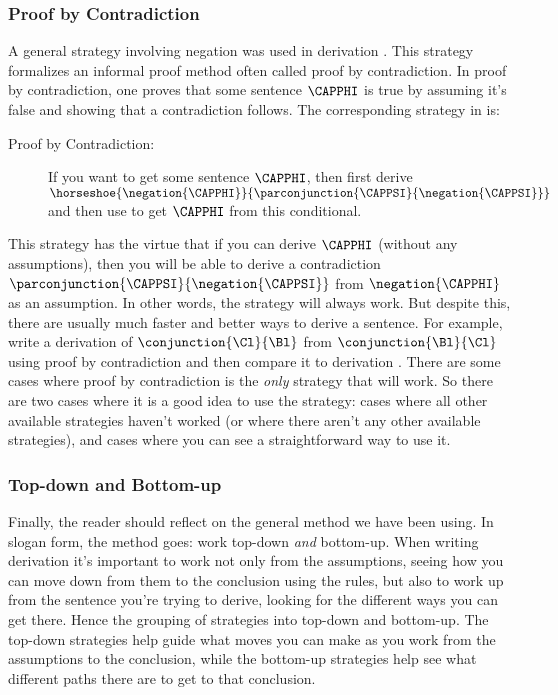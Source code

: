 \subsubsection*{Proof by Contradiction}
A general strategy involving negation was used in derivation . 
This strategy formalizes an informal proof method often called proof by contradiction. 
In proof by contradiction, one proves that some sentence $\CAPPHI$ is true by assuming it's false and showing that a contradiction follows. 
The corresponding strategy in \GSD{} is:
\begin{description}
\item[Proof by Contradiction:] If you want to get some sentence $\CAPPHI$, then first derive $\horseshoe{\negation{\CAPPHI}}{\parconjunction{\CAPPSI}{\negation{\CAPPSI}}}$ and then use  to get $\CAPPHI$ from this conditional.  
\end{description}
This strategy has the virtue that if you can derive $\CAPPHI$ (without any assumptions), then you will be able to derive a contradiction $\parconjunction{\CAPPSI}{\negation{\CAPPSI}}$ from $\negation{\CAPPHI}$ as an assumption. In other words, the strategy will always work. But despite this, there are usually much faster and better ways to derive a sentence. 
For example, write a derivation of $\conjunction{\Cl}{\Bl}$ from $\conjunction{\Bl}{\Cl}$ using proof by contradiction and then compare it to derivation . 
There are some cases where proof by contradiction is the \emph{only} strategy that will work. 
So there are two cases where it is a good idea to use the strategy: cases where all other available strategies haven't worked (or where there aren't any other available strategies), and cases where you can see a straightforward way to use it. 

\subsubsection*{Top-down and Bottom-up} Finally, the reader should reflect on the general method we have been using. In slogan form, the method goes: work top-down \emph{and} bottom-up. When writing derivation it's important to work not only from the assumptions, seeing how you can move down from them to the conclusion using the rules, but also to work up from the sentence you're trying to derive, looking for the different ways you can get there. Hence the grouping of strategies into top-down and bottom-up. The top-down strategies help guide what moves you can make as you work from the assumptions to the conclusion, while the bottom-up strategies help see what different paths there are to get to that conclusion. 

